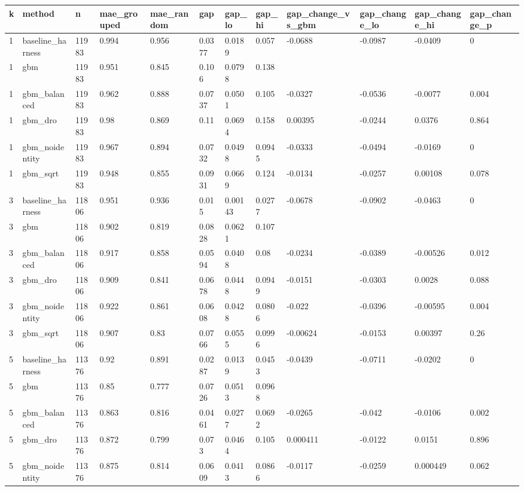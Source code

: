 \begin{tabular}{llllllllllll}
\toprule
k & method & n & mae\_grouped & mae\_random & gap & gap\_lo & gap\_hi & gap\_change\_vs\_gbm & gap\_change\_lo & gap\_change\_hi & gap\_change\_p \\
\midrule
1 & baseline\_harness & 11983 & 0.994 & 0.956 & 0.0377 & 0.0189 & 0.057 & -0.0688 & -0.0987 & -0.0409 & 0 \\
1 & gbm & 11983 & 0.951 & 0.845 & 0.106 & 0.0798 & 0.138 &  &  &  &  \\
1 & gbm\_balanced & 11983 & 0.962 & 0.888 & 0.0737 & 0.0501 & 0.105 & -0.0327 & -0.0536 & -0.0077 & 0.004 \\
1 & gbm\_dro & 11983 & 0.98 & 0.869 & 0.11 & 0.0694 & 0.158 & 0.00395 & -0.0244 & 0.0376 & 0.864 \\
1 & gbm\_noidentity & 11983 & 0.967 & 0.894 & 0.0732 & 0.0498 & 0.0945 & -0.0333 & -0.0494 & -0.0169 & 0 \\
1 & gbm\_sqrt & 11983 & 0.948 & 0.855 & 0.0931 & 0.0669 & 0.124 & -0.0134 & -0.0257 & 0.00108 & 0.078 \\
3 & baseline\_harness & 11806 & 0.951 & 0.936 & 0.015 & 0.00143 & 0.0277 & -0.0678 & -0.0902 & -0.0463 & 0 \\
3 & gbm & 11806 & 0.902 & 0.819 & 0.0828 & 0.0621 & 0.107 &  &  &  &  \\
3 & gbm\_balanced & 11806 & 0.917 & 0.858 & 0.0594 & 0.0408 & 0.08 & -0.0234 & -0.0389 & -0.00526 & 0.012 \\
3 & gbm\_dro & 11806 & 0.909 & 0.841 & 0.0678 & 0.0448 & 0.0949 & -0.0151 & -0.0303 & 0.0028 & 0.088 \\
3 & gbm\_noidentity & 11806 & 0.922 & 0.861 & 0.0608 & 0.0428 & 0.0806 & -0.022 & -0.0396 & -0.00595 & 0.004 \\
3 & gbm\_sqrt & 11806 & 0.907 & 0.83 & 0.0766 & 0.0555 & 0.0996 & -0.00624 & -0.0153 & 0.00397 & 0.26 \\
5 & baseline\_harness & 11376 & 0.92 & 0.891 & 0.0287 & 0.0139 & 0.0453 & -0.0439 & -0.0711 & -0.0202 & 0 \\
5 & gbm & 11376 & 0.85 & 0.777 & 0.0726 & 0.0513 & 0.0968 &  &  &  &  \\
5 & gbm\_balanced & 11376 & 0.863 & 0.816 & 0.0461 & 0.0277 & 0.0692 & -0.0265 & -0.042 & -0.0106 & 0.002 \\
5 & gbm\_dro & 11376 & 0.872 & 0.799 & 0.073 & 0.0464 & 0.105 & 0.000411 & -0.0122 & 0.0151 & 0.896 \\
5 & gbm\_noidentity & 11376 & 0.875 & 0.814 & 0.0609 & 0.0413 & 0.0866 & -0.0117 & -0.0259 & 0.000449 & 0.062 \\

\end{tabular}
